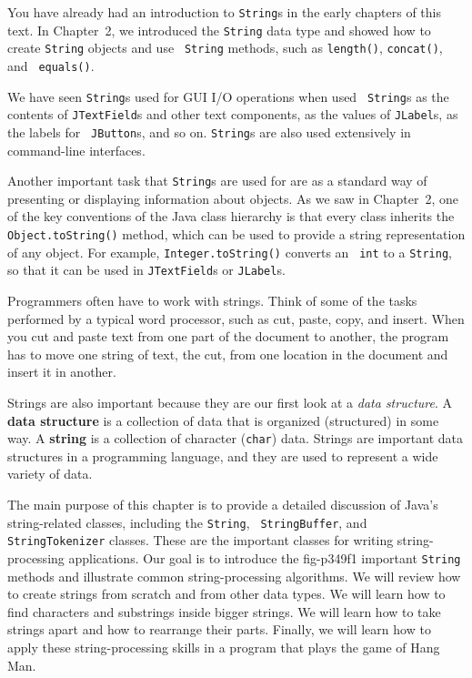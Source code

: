 You have already had an introduction to {\tt String}s in the early
chapters of this text.  In Chapter~2, we introduced the {\tt String}
data type and showed how to create {\tt String} objects and use {\tt
String} methods, such as {\tt length()}, {\tt concat()}, and {\tt
equals()}.

We have seen {\tt String}s used for GUI I/O operations when used {\tt
String}s as the contents of {\tt JTextField}s and other text
components, as the values of {\tt JLabel}s, as the labels for {\tt
JButton}s, and so on. {\tt String}s are also used extensively in
command-line interfaces.

Another important task that {\tt String}s are used for are as a
standard way of presenting or displaying information about objects.
As we saw in Chapter~2, one of the key conventions of the Java class
hierarchy is that every class inherits the {\tt Object.toString()}
method, which can be used to provide a string representation of any
object.  For example, \mbox{\tt Integer.toString()} converts an {\tt
int} to a {\tt String}, so that it can be used in {\tt JTextField}s or
{\tt JLabel}s.

Programmers often have to work with strings.   Think of some of the
tasks performed by a typical word processor, such as cut, paste, copy,
and insert.  When you cut and paste text from one part of the document
to another, the program has to move one string of text, the cut, from
one location in the document and insert it in another.

Strings are also important because they are our first look at a {\em
data structure}.  A {\bf data structure} is a
collection of data that is organized (structured) in some way.  A {\bf
string} is a collection of character ({\tt char}) data.  Strings are
important data structures in a programming language, and they are used
to represent a wide variety of data.

The main purpose of this chapter is to provide a detailed discussion
of Java's string-related classes, including the {\tt String}, {\tt
StringBuffer}, and {\tt StringTokenizer} classes.  These are the
important classes for writing string-processing applications.  Our
goal is to introduce the
{fig-p349f1}
important {\tt String} methods and illustrate common string-processing
algorithms.  We will review how to create strings from scratch and from
other data types. We will learn how to find characters and substrings
inside bigger strings.  We will learn how to take strings apart and
how to rearrange their parts.   Finally, we will learn how to apply these
string-processing skills in a program that plays the game of Hang Man.


